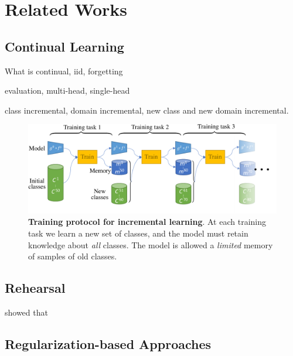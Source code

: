 \chapter{Related Works}
\label{chapter:related}

{}


\section{Continual Learning}

What is continual, iid, forgetting

evaluation, multi-head, single-head

class incremental, domain incremental, new class and new domain incremental. \cite{lomonaco2017core50}

\begin{figure}[tb]
    \begin{center}
        \includegraphics[width=0.8\linewidth]{images/podnet/protocol}
    \end{center}
    \caption{\textbf{Training protocol for incremental learning}. At each training task we learn a
        new set of classes, and the model must retain knowledge about \textit{all} classes. The
        model is allowed a \textit{limited} memory of samples of old classes.}
    \label{fig:protocol}
\end{figure}


\section{Rehearsal}

\citep{lesort2019regulshortcomings} showed that

\section{Regularization-based Approaches}

